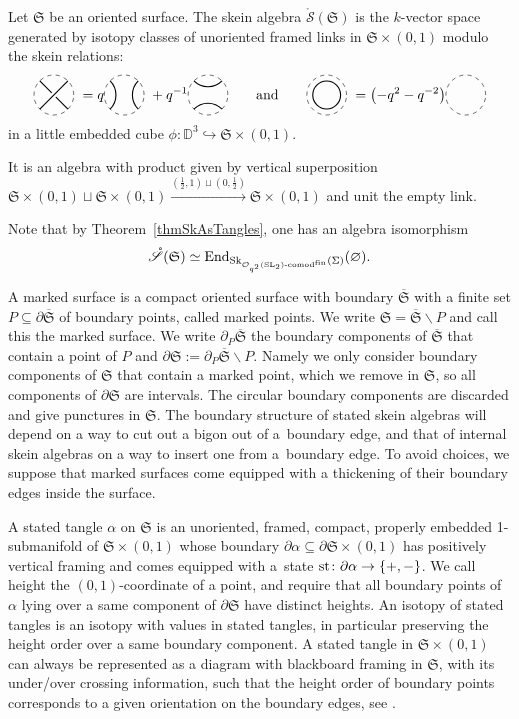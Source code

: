 \documentclass[pdftex]{sigma}%
\numberwithin{equation}{section}
\newcommand{\Kaufhoriz}{\begin{tikzpicture}[scale = 0.5, baseline = -3pt]
\draw[dashed] (0,0) circle(1);
\draw[thick] (45:1) arc (-45:-135:1);
\draw[thick] (-45:1) arc (45:135:1);
\end{tikzpicture}}
\newcommand{\Kaufvert}{\begin{tikzpicture}[scale = 0.5, baseline = -3pt]
\draw[dashed] (0,0) circle(1);
\draw[thick] (45:1) arc (135:225:1);
\draw[thick] (135:1) arc (45:-45:1);
\end{tikzpicture}}
\newcommand{\Kauftresse}{\begin{tikzpicture}[scale = 0.5, baseline = -3pt]
\draw[dashed] (0,0) circle(1);
\draw[thick] (-45:1) -- (135:1) node[fill, color= white, pos = 0.5, circle, scale = 0.45]{};
\draw[thick] (45:1) -- (-135:1);
\end{tikzpicture}}
\newcommand{\Kaufcirc}{\begin{tikzpicture}[scale = 0.5, baseline = -3pt]
\draw[dashed] (0,0) circle(1);
\draw[thick] (0,0) circle(0.7);
\end{tikzpicture}}
\newcommand{\Kaufvide}{\begin{tikzpicture}[scale = 0.5, baseline = -3pt]
\draw[dashed] (0,0) circle(1);
\end{tikzpicture}}
\newcommand{\End}{\operatorname{End}}
\newcommand{\Oqcomfin}{\Oq\text{-}{\rm comod}^{\rm fin}}
\newcommand{\Oq}{\mathcal{O}_{q^2}({\rm SL}_2)}
\begin{document}
\begin{Definition}
Let $\mathfrak{S}$ be an oriented surface. The skein algebra $\mathring{\mathscr{S}}(\mathfrak{S})$ is the $k$-vector space generated by isotopy classes of unoriented framed links in $\mathfrak{S}\times (0,1)$ modulo the skein relations:
\[ \Kauftresse \ = q \Kaufvert\ +q^{-1} \Kaufhoriz \qquad \text{and} \qquad \Kaufcirc \ = \big({-}q^2-q^{-2}\big) \Kaufvide \]
in a little embedded cube $\phi\colon \mathbb{D}^3 \hookrightarrow \mathfrak{S}\times (0,1)$.

It is an algebra with product given by vertical superposition $\mathfrak{S}\times (0,1) \sqcup \mathfrak{S}\times (0,1) \overset{\left(\frac{1}{2},1\right)\sqcup\left(0,\frac{1}{2}\right)}\longrightarrow \mathfrak{S} \times (0,1)$ and unit the empty link.
\end{Definition}

Note that by Theorem~\ref{thmSkAsTangles}, one has an algebra isomorphism
\[
\mathring{\mathscr{S}}(\mathfrak{S}) \simeq \End_{{\rm Sk}_{\Oqcomfin}(\Sigma)}(\varnothing).
\]

\begin{Definition}
A marked surface is a compact oriented surface with boundary $\overline{\mathfrak{S}}$ with a finite set $P\subseteq \partial\overline{\mathfrak{S}}$ of boundary points, called marked points. We write $\mathfrak{S} = \overline{\mathfrak{S}} \smallsetminus P$ and call this the marked surface. We write $\partial_P\overline{\mathfrak{S}}$ the boundary components of $\overline{\mathfrak{S}}$ that contain a point of $P$ and $\partial \mathfrak{S} := \partial_P\overline{\mathfrak{S}} \smallsetminus P$. Namely we only consider boundary components of $\mathfrak{S}$ that contain a marked point, which we remove in $\mathfrak{S}$, so all components of $\partial \mathfrak{S}$ are intervals. The circular boundary components are discarded and give punctures in $\mathfrak{S}$. The boundary structure of stated skein algebras will depend on a way to cut out a bigon out of a~boundary edge, and that of internal skein algebras on a way to insert one from a~boundary edge. To avoid choices, we suppose that marked surfaces come equipped with a thickening of their boundary edges inside the surface.

A stated tangle $\alpha$ on $\mathfrak{S}$ is an unoriented, framed, compact, properly embedded 1-submanifold of $\mathfrak{S} \times (0,1)$ whose boundary $\partial \alpha \subseteq \partial\mathfrak{S} \times (0,1)$ has positively vertical framing and comes equipped with a~state ${\rm st}\colon \partial \alpha \to \{+,-\}$. We call height the $(0,1)$-coordinate of a point, and require that all boundary points of $\alpha$ lying over a same component of $\partial\mathfrak{S}$ have distinct heights. An isotopy of stated tangles is an isotopy with values in stated tangles, in particular preserving the height order over a same boundary component. A stated tangle in $\mathfrak{S} \times (0,1)$ can always be represented as a diagram with blackboard framing in $\mathfrak{S}$, with its under/over crossing information, such that the height order of boundary points corresponds to a given orientation on the boundary edges, see \cite[Section~3.5]{BonahonWong}.
\end{Definition}
\end{document}
